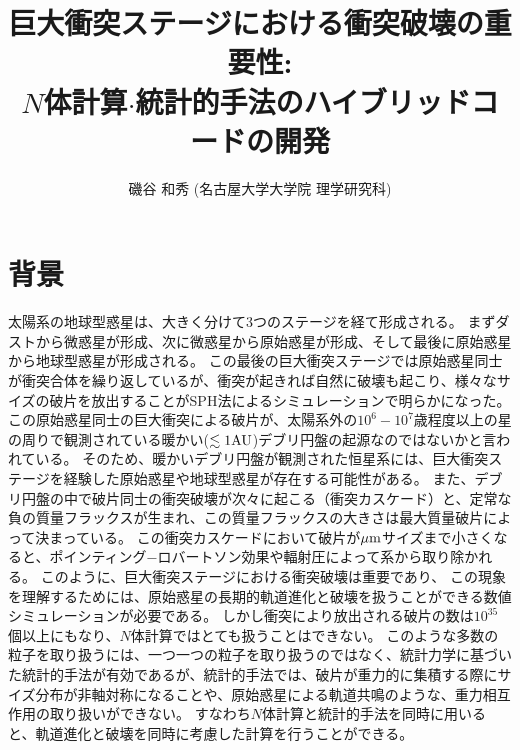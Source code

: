 \documentclass[a4paper,10pt,oneside,twocolumn,notitlepage,final]{jarticle}
\author{磯谷 和秀 (名古屋大学大学院 理学研究科)}
\title{巨大衝突ステージにおける衝突破壊の重要性:\\
$N$体計算$\cdot$統計的手法のハイブリッドコードの開発}
\begin{document}




\section{背景}
太陽系の地球型惑星は、大きく分けて3つのステージを経て形成される。
まずダストから微惑星が形成、次に微惑星から原始惑星が形成、そして最後に原始惑星から地球型惑星が形成される。
この最後の巨大衝突ステージでは原始惑星同士が衝突合体を繰り返しているが、衝突が起きれば自然に破壊も起こり、様々なサイズの破片を放出することがSPH法によるシミュレーションで明らかになった\citep[e.g.,][]{Genda2015}。
この原始惑星同士の巨大衝突による破片が、太陽系外の$10^6 - 10^7$歳程度以上の星の周りで観測されている暖かい($\lesssim 1 {\rm AU}$)デブリ円盤の起源なのではないかと言われている\citep[e.g.,][]{Lisse2008,Lisse2009}。
そのため、暖かいデブリ円盤が観測された恒星系には、巨大衝突ステージを経験した原始惑星や地球型惑星が存在する可能性がある。
また、デブリ円盤の中で破片同士の衝突破壊が次々に起こる（衝突カスケード）と、定常な負の質量フラックスが生まれ\citep[e.g.,][]{Tanaka1996}、この質量フラックスの大きさは最大質量破片によって決まっている。
この衝突カスケードにおいて破片が$\mu {\rm m}$サイズまで小さくなると、ポインティング−ロバートソン効果や輻射圧によって系から取り除かれる。
このように、巨大衝突ステージにおける衝突破壊は重要であり、
この現象を理解するためには、原始惑星の長期的軌道進化と破壊を扱うことができる数値シミュレーションが必要である。
しかし衝突により放出される破片の数は$10^{35}$個以上にもなり、$N$体計算ではとても扱うことはできない。
このような多数の粒子を取り扱うには、一つ一つの粒子を取り扱うのではなく、統計力学に基づいた統計的手法が有効であるが、統計的手法では、破片が重力的に集積する際にサイズ分布が非軸対称になることや、原始惑星による軌道共鳴のような、重力相互作用の取り扱いができない。
すなわち$N$体計算と統計的手法を同時に用いると、軌道進化と破壊を同時に考慮した計算を行うことができる。
\end{document}
